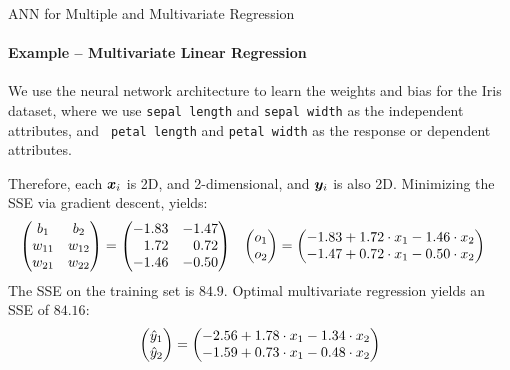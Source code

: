 \begin{frame}{ANN for Multiple and Multivariate Regression}
\framesubtitle{Example -- Multivariate Linear Regression}
We use the neural network architecture 
to learn the weights
and bias for the Iris dataset, where we use {\tt sepal
length} and {\tt sepal width} as the independent attributes, and {\tt
petal length} and {\tt petal width} as the response or dependent
attributes. 

\medskip

Therefore, each %
${\boldsymbol x}_i$ is 2D, and 2-dimensional, and
${\boldsymbol y}_i$ is also 2D.%
Minimizing the %
SSE via gradient descent, yields:%
\begin{align*}
    \matr{%
        b_1 & b_2\\
        w_{11} & w_{12}\\
        w_{21} & w_{22}
    } & = 
    \amatr{r}{
  -1.83 & -1.47\\
  1.72 &  0.72\\
  -1.46 & -0.50
  } &
    \matr{o_1 \\ o_2} & =
    \matr{
        -1.83 + 1.72 \cdot x_{1} - 1.46 \cdot x_2\\
        -1.47 + 0.72 \cdot x_{1} - 0.50 \cdot x_2
    }
\end{align*}
The SSE %
on the training set is $84.9$. Optimal %
multivariate regression yields an %
SSE of $84.16$: %
\begin{align*}
    \begin{pmatrix} \hat{y}_1 \\ \hat{y}_2 \end{pmatrix} =
    \begin{pmatrix} 
        -2.56 + 1.78 \cdot x_{1} - 1.34 \cdot x_2\\
        -1.59 + 0.73 \cdot x_{1} - 0.48 \cdot x_2
     \end{pmatrix}
\end{align*}
\end{frame}
%
%
%

